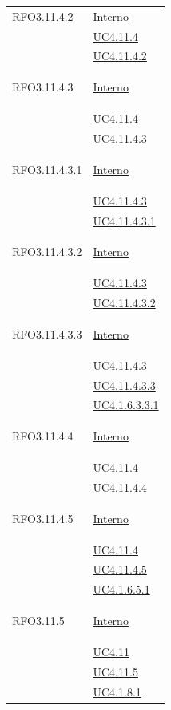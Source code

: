 \begin{longtable}{|>{\centering}m{5cm}|m{5cm}<{\centering}|}
\hypertarget{RFO3.11.4.2}{RFO3.11.4.2} & \hyperlink{Interno}{Interno}\\
&\hyperref[UC4.11.4]{UC4.11.4}\\
&\hyperref[UC4.11.4.2]{UC4.11.4.2}\\ \hline

\hypertarget{RFO3.11.4.3}{RFO3.11.4.3} & \hyperlink{Interno}{Interno}\\
&\hyperref[UC4.11.4]{UC4.11.4}\\
&\hyperref[UC4.11.4.3]{UC4.11.4.3}\\ \hline

\hypertarget{RFO3.11.4.3.1}{RFO3.11.4.3.1} & \hyperlink{Interno}{Interno}\\
& \hyperref[UC4.11.4.3]{UC4.11.4.3}\\
& \hyperref[UC4.11.4.3.1]{UC4.11.4.3.1}\\ \hline

\hypertarget{RFO3.11.4.3.2}{RFO3.11.4.3.2} & \hyperlink{Interno}{Interno}\\
& \hyperref[UC4.11.4.3]{UC4.11.4.3}\\
& \hyperref[UC4.11.4.3.2]{UC4.11.4.3.2}\\ \hline

\hypertarget{RFO3.11.4.3.3}{RFO3.11.4.3.3} & \hyperlink{Interno}{Interno}\\
& \hyperref[UC4.11.4.3]{UC4.11.4.3}\\
&\hyperref[UC4.11.4.3.3]{UC4.11.4.3.3}\\
&\hyperref[UC4.1.6.3.3.1]{UC4.1.6.3.3.1}\\ \hline

\hypertarget{RFO3.11.4.4}{RFO3.11.4.4} & \hyperlink{Interno}{Interno}\\
&\hyperref[UC4.11.4]{UC4.11.4}\\
&\hyperref[UC4.11.4.4]{UC4.11.4.4}\\ \hline

\hypertarget{RFO3.11.4.5}{RFO3.11.4.5} & \hyperlink{Interno}{Interno}\\
&\hyperref[UC4.11.4]{UC4.11.4}\\
&\hyperref[UC4.11.4.5]{UC4.11.4.5}\\ 
&\hyperref[UC4.1.6.5.1]{UC4.1.6.5.1}\\ \hline

\hypertarget{RFO3.11.5}{RFO3.11.5} &  \hyperlink{Interno}{Interno}\\
&\hyperref[UC4.11]{UC4.11}\\
&\hyperref[UC4.11.5]{UC4.11.5}\\ 
&\hyperref[UC4.1.8.1]{UC4.1.8.1}\\ \hline


\end{longtable}
